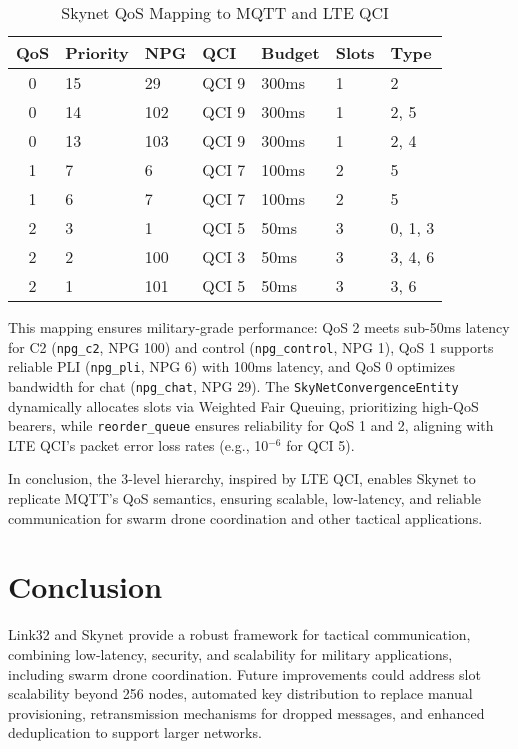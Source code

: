 \documentclass{article}
\begin{document}
\begin{table}[h]
\centering
\caption{Skynet QoS Mapping to MQTT and LTE QCI}
\begin{tabular}{cllllll}
\hline
\textbf{QoS} & \textbf{Priority} & \textbf{NPG} & \textbf{QCI} & \textbf{Budget} & \textbf{Slots} & \textbf{Type} \\
\hline
0 & 15 & 29  & QCI 9 & 300ms & 1 & 2 \\
0 & 14 & 102 & QCI 9 & 300ms & 1 & 2, 5 \\
0 & 13 & 103 & QCI 9 & 300ms & 1 & 2, 4 \\
1 & 7  & 6   & QCI 7 & 100ms & 2 & 5 \\
1 & 6  & 7   & QCI 7 & 100ms & 2 & 5 \\
2 & 3  & 1   & QCI 5 & 50ms  & 3 & 0, 1, 3 \\
2 & 2  & 100 & QCI 3 & 50ms  & 3 & 3, 4, 6 \\
2 & 1  & 101 & QCI 5 & 50ms  & 3 & 3, 6 \\
\hline
\end{tabular}
\end{table}

This mapping ensures military-grade performance: QoS 2 meets sub-50ms latency for C2 (\texttt{npg\_c2},
NPG 100) and control (\texttt{npg\_control}, NPG 1), QoS 1 supports reliable PLI (\texttt{npg\_pli},
NPG 6) with 100ms latency, and QoS 0 optimizes bandwidth for chat (\texttt{npg\_chat}, NPG 29). The
\texttt{SkyNetConvergenceEntity} dynamically allocates slots via Weighted Fair Queuing, prioritizing
high-QoS bearers, while \texttt{reorder\_queue} ensures reliability for QoS 1 and 2, aligning with
LTE QCI’s packet error loss rates (e.g., 10$^{-6}$ for QCI 5).

In conclusion, the 3-level hierarchy, inspired by LTE QCI, enables Skynet to replicate MQTT’s QoS
semantics, ensuring scalable, low-latency, and reliable communication for swarm drone coordination and
other tactical applications.

\section{Conclusion}
Link32 and Skynet provide a robust framework for tactical communication, combining low-latency,
security, and scalability for military applications, including swarm drone coordination. Future
improvements could address slot scalability beyond 256 nodes, automated key distribution to replace
manual provisioning, retransmission mechanisms for dropped messages, and enhanced deduplication to
support larger networks.
\end{document}
